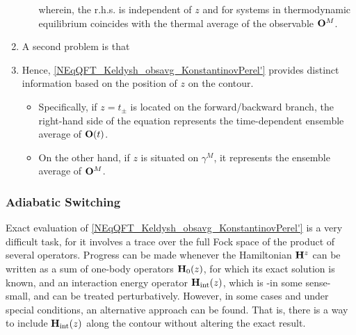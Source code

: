 \begin{enumerate}
\begin{itemize}
        wherein, the r.h.s. is independent of $z$ and for systems in thermodynamic equilibrium coincides with the thermal average of the observable ${\bf O}^M$. 
        
        \end{itemize}

        \item A second problem is that 
        
        \item Hence, \cref{NEqQFT_Keldysh_obsavg_KonstantinovPerel'} provides distinct information based on the position of $z$ on the contour.
        
        \begin{itemize}
            \item Specifically, if $z = t_{\pm}$ is located on the forward/backward branch, the right-hand side of the equation represents the time-dependent ensemble average of ${\bf O}(t)$. 
            \item On the other hand, if $z$ is situated on $\gamma^M$, it represents the ensemble average of ${\bf O}^M$.
        \end{itemize}
\end{enumerate}

\subsubsection{Adiabatic Switching}

Exact evaluation of \cref{NEqQFT_Keldysh_obsavg_KonstantinovPerel'} is a very difficult task, for it involves a trace over the full Fock space of the product of several operators.
Progress can be made whenever the Hamiltonian ${\bf H}^z$ can be written as a sum of one-body operators ${\bf H}_0 (z)$, for which its exact solution is known, and an interaction energy operator ${\bf H}_{\textnormal{int}}(z)$, which is -in some sense- small, and can be treated perturbatively. 
However, in some cases and under special conditions, an alternative approach can be found. 
That is, there is a way to include ${\bf H}_{\textnormal{int}}(z)$ along the contour without altering the exact result.


\clearpage
